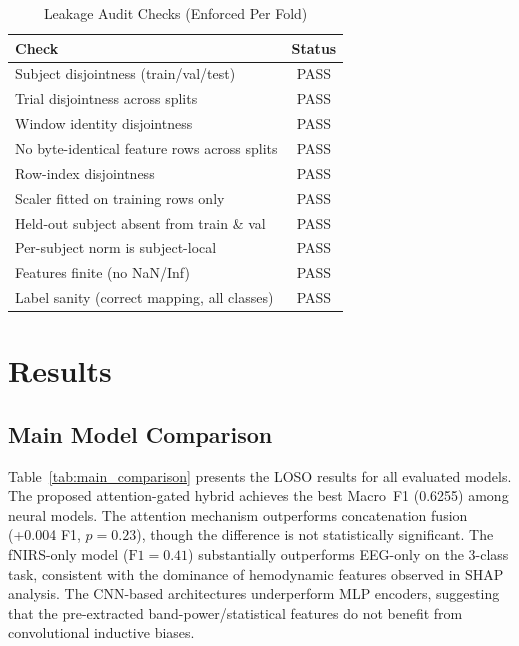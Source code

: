 \documentclass[conference]{IEEEtran}
\begin{document}
\begin{table}[t]
\centering
\caption{Leakage Audit Checks (Enforced Per Fold)}
\label{tab:leakage}
\footnotesize
\begin{tabular}{@{}lc@{}}
\toprule
\textbf{Check} & \textbf{Status} \\
\midrule
Subject disjointness (train/val/test) & PASS \\
Trial disjointness across splits & PASS \\
Window identity disjointness & PASS \\
No byte-identical feature rows across splits & PASS \\
Row-index disjointness & PASS \\
Scaler fitted on training rows only & PASS \\
Held-out subject absent from train \& val & PASS \\
Per-subject norm is subject-local & PASS \\
Features finite (no NaN/Inf) & PASS \\
Label sanity (correct mapping, all classes) & PASS \\
\bottomrule
\end{tabular}
\end{table}


\section{Results}

\subsection{Main Model Comparison}

Table~\ref{tab:main_comparison} presents the LOSO results for all evaluated models. The proposed attention-gated hybrid achieves the best Macro~F1 (0.6255) among neural models. The attention mechanism outperforms concatenation fusion (+0.004 F1, $p = 0.23$), though the difference is not statistically significant. The fNIRS-only model ($\text{F1} = 0.41$) substantially outperforms EEG-only on the 3-class task, consistent with the dominance of hemodynamic features observed in SHAP analysis. The CNN-based architectures underperform MLP encoders, suggesting that the pre-extracted band-power/statistical features do not benefit from convolutional inductive biases.
\end{document}
